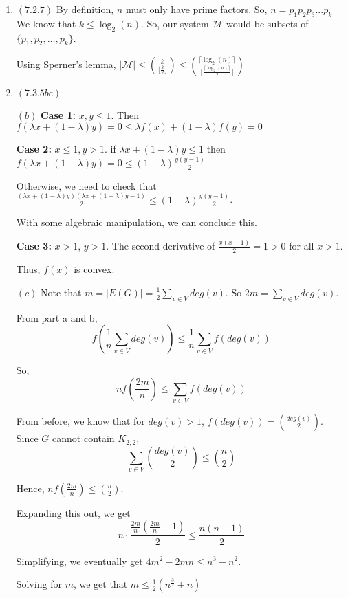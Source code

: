 \documentclass[12pt]{article}
\begin{document}
\begin{enumerate}[start=1,label={\bfseries Problem \arabic*:},leftmargin=1in]
    \item $(7.2.7)$ By definition, $n$ must only have prime factors. So, $n = p_{1}p_{2}p_{3}...p_{k}$ 
    We know that $k \leq \log_{2}(n)$. So, our system $\mathcal{M}$ would be subsets of $\{ p_{1}, p_{2}, \dots, p_{k}\}$. 

    Using Sperner's lemma, $\left| \mathcal{M} \right| \leq \binom{k}{\lfloor \frac{k}{2} \rfloor} \leq \binom{\lceil \log_{2}(n) \rceil}{\lfloor \frac{\lceil \log_{2}(n) \rceil}{2} \rfloor} $

    \item $(7.3.5bc)$ 
    
    $(b)$
    \textbf{Case 1:} $x, y \leq 1$. Then $f(\lambda x + (1-\lambda)y) = 0 \leq \lambda f(x) + (1-\lambda)f(y) = 0 $  

    \textbf{Case 2:} $x \leq 1, y > 1$. if $\lambda x + (1- \lambda)y \leq 1$ then $f(\lambda x + (1- \lambda)y) = 0 \leq (1- \lambda )\frac{y(y-1)}{2}$

    Otherwise, we need to check that $\frac{(\lambda x + (1- \lambda)y)(\lambda x + (1- \lambda)y - 1)}{2} \leq (1-\lambda)\frac{y(y-1)}{2}$.
    
    With some algebraic manipulation, we can conclude this.
    
    
    \textbf{Case 3:} $x > 1$, $y > 1$. The second derivative of $\frac{x(x-1)}{2} = 1 > 0$ for all $x > 1$. 
    
    Thus, $f(x)$ is convex. 


    $(c)$ Note that $m = \left| E(G) \right| = \frac{1}{2} \sum_{v \in V} deg(v)$. So $2m = \sum_{v \in V} deg(v)$. 
    
    From part a and b, \[f(\frac{1}{n}\sum_{v\in V} deg(v)) \leq \frac{1}{n} \sum_{v \in V} f(deg(v))\] 

    So, \[nf(\frac{2m}{n}) \leq \sum_{v \in V} f(deg(v))\]

    From before, we know that for $deg(v) > 1$, $f(deg(v)) = \binom{deg(v)}{2}$. Since $G$ cannot contain $K_{2, 2}$, 
    \[ \sum_{v\in V} \binom{deg(v)}{2} \leq \binom{n}{2} \]

    Hence, 
    $nf(\frac{2m}{n}) \leq \binom{n}{2}$. 

    Expanding this out, we get \[n \cdot \frac{\frac{2m}{n}(\frac{2m}{n} - 1)}{2} \leq \frac{n(n-1)}{2}\]

    Simplifying, we eventually get $4m^{2} - 2mn \leq n^{3} - n^{2}$. 

    Solving for $m$, we get that $m \leq \frac{1}{2}(n^{\frac{3}{2}} + n)$


\end{enumerate}
\end{document}
